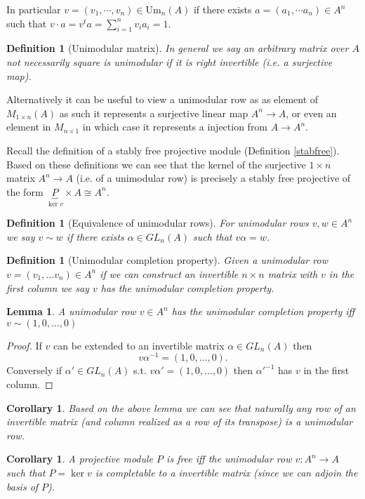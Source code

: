 \documentclass[12pt]{report}
\numberwithin{equation}{section}
\newcounter{dummy} \numberwithin{dummy}{section}
\newtheorem{definition}[dummy]{Definition}
\newtheorem{corollary}[dummy]{Corollary}
\newtheorem{lemma}[dummy]{Lemma}
\begin{document}
	In particular $v=(v_1, \cdots, v_n) \in \mathrm{Um}_n(A) $ if there exists $a=(a_1, \cdots a_n) \in A^n$ such that $ v \cdot a = v^t a = \sum_{i=1}^n v_i a_i = 1$.
	\begin{definition}[Unimodular matrix]
		In general we say an arbitrary matrix over $A$ not necessarily square is unimodular if it is right invertible (i.e. a surjective map).
	\end{definition}
	Alternatively it can be useful to view a unimodular row as as element of $M_{1 \times n} (A) $ as such it represents a surjective linear map $A^n \to A$, or even an element in $M_{n \times 1}$ in which case it represents a injection from $A \to A^n$.
	
	Recall the definition of a stably free projective module (Definition \ref{stabfree}). Based on these definitions we can see that the kernel of the surjective $1 \times n $ matrix $A^n \to A$ (i.e. of a unimodular row) is precisely a stably free projective of the form $\underbrace{P}_{\ker v} \times A \cong A^n$.
	
	
	
	\begin{definition}[Equivalence of unimodular rows]
		For unimodular rows $v,w\in A^n$ we say $v \sim w $ if there exists $ \alpha \in GL_n(A)$ such that $v\alpha =w$.
	\end{definition}
	
	\begin{definition}[Unimodular completion property]
		Given a unimodular row $v=(v_1,\dots v_n) \in A^n$ if we can construct an invertible $n \times n $  matrix with $v$ in the first column we say $v$ has the unimodular completion property.
	\end{definition}
	

	
	\begin{lemma}
		A unimodular row $v \in A^n$ has the unimodular completion property iff $v \sim (1,0,\dots ,0)$
	\end{lemma}
	\begin{proof}
		If $v$ can be extended to an invertible matrix $\alpha \in GL_n(A)$ then \[ v\alpha^{-1}  = (1,0,\dots, 0). \]
		Conversely if $\alpha' \in GL_n(A) $ s.t. $v\alpha'=(1,0,\dots,0)$ then $\alpha'^{-1}$ has $v$ in the first column.
	\end{proof}
		\begin{corollary}\label{row-of-inv-mat-unimod}
		Based on the above lemma we can see that naturally any row of an invertible matrix (and column realized as a row of its transpose) is a unimodular row. 
	\end{corollary}
	\begin{corollary}
		A projective module $P$ is free iff the unimodular row $v: A^n \to A$ such that $P=\ker v$ is completable to a invertible matrix (since we can adjoin the basis of $P$).
	\end{corollary}
	
\end{document}
